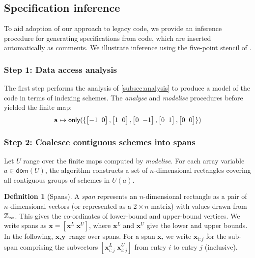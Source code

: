 \documentclass[10pt,preprint]{sigplanconf}
\newcounter{block}
\theoremstyle{definition}
\newtheorem{definition}[block]{Definition}
\newcommand{\vect}[1]{\textbf{#1}}
\newcommand{\vtwoh}[2]{\setlength{\arraycolsep}{0em}
\left[\begin{array}{cc}#1 \; & \; #2\end{array}\right]}
\begin{document}
\subsection{Specification inference}
\label{subsec:inference}

To aid adoption of our approach to legacy code, we provide
an inference procedure for generating specifications from code, which
are inserted automatically as comments.
We illustrate inference using the
 five-point stencil of
 .

\subsubsection{Step 1: Data access analysis}
\label{sec:inf-step1}

The first step performs the
analysis of \cref{subsec:analysis} to produce a
model of the code in terms of indexing schemes.
The \emph{analyse} and \emph{modelise} procedures before yielded the finite map:
%
\begin{align*}
\texttt{a} \mapsto \mathsf{only}(\{\vtwoh{-1}{0}, \vtwoh{1}{0},
          \vtwoh{0}{-1}, \vtwoh{0}{1}, \vtwoh{0}{0}\})
\end{align*}
%

\subsubsection{Step 2: Coalesce contiguous schemes into spans}
\label{sec:inf-step3}

Let $U$ range over the finite maps computed by \textit{modelise}.  For
each array variable $a \in \mathsf{dom}(U)$, the algorithm constructs a set of
$n$-dimensional rectangles covering all contiguous groups of schemes
in $U(a)$.

\newcommand{\spanOp}{\textsf{spans}}

\begin{definition}[Spans]
  A \emph{span} represents an $n$-dimensional rectangle
  as a pair of $n$-dimensional vectors (or
  represented as a $2 \times n$ matrix) with values drawn from
  $\mathbb{Z}_\infty{}$. This gives the co-ordinates of lower-bound 
  and upper-bound vertices. We write
  spans as $\vect{x} = [\vect{x}^L \; \vect{x}^U]$, where $\vect{x}^L$
  and $\vect{x}^U$ give the lower and upper bounds.  In
  the following, $\vect{x}, \vect{y}$ range over spans.  For a span
  $\vect{x}$, we write $\vect{x}_{i:j}$ for the sub-span comprising the
  subvectors $[\vect{x}^L_{i:j} \; \vect{x}^U_{i:j}]$ from entry $i$
  to entry $j$ (inclusive).
\end{definition}
\end{document}
